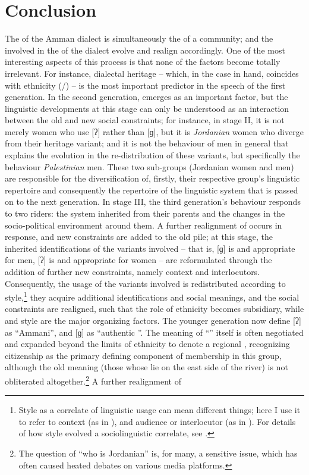 \documentclass[output=paper]{langsci/langscibook}
\begin{document}
\section{Conclusion}

The  of the Amman dialect is simultaneously the  of a community; and the  involved in the  of the dialect evolve and realign accordingly. One of the most interesting aspects of this process is that none of the factors become totally irrelevant. For instance, dialectal heritage – which, in the case in hand, coincides with ethnicity (/) – is the most important predictor in the speech of the first generation. In the second generation,  emerges as an important factor, but the linguistic developments at this stage can only be understood as an interaction between the old and new social constraints; for instance, in stage II, it is not merely women who use [ʔ] rather than [ɡ], but it is \textit{Jordanian} women who diverge from their heritage variant; and it is not the behaviour of men in general that explains the evolution in the re-distribution of these variants, but specifically the behaviour \textit{Palestinian} men. These two sub-groups (Jordanian women and  men) are responsible for the diversification of, firstly, their respective group’s linguistic repertoire and consequently the repertoire of the linguistic system that is passed on to the next generation. In stage III, the third generation’s behaviour responds to two riders: the system inherited from their parents and the changes in the socio-political environment around them. A further realignment of  occurs in response, and new constraints are added to the old pile; at this stage, the inherited identifications of the variants involved – that is, [ɡ] is  and appropriate for men, [ʔ] is  and appropriate for women – are reformulated through the addition of further new constraints, namely context and interlocutors. Consequently, the usage of the variants involved is redistributed according to style,\footnote{Style as a correlate of linguistic usage can mean different things; here I use it to refer to context (as in \citealt{Labov1972}), and audience or interlocutor (as in \citealt{Bell1984}). For details of how style evolved a sociolinguistic correlate, see \citet{EckertRickford2001}.} they acquire additional identifications and social meanings, and the social constraints are realigned, such that the role of ethnicity becomes subsidiary, while  and style are the major organizing factors. The younger generation now define [ʔ] as ``Ammani'', and [ɡ] as ``authentic ''. The meaning of ``'' itself is often negotiated and expanded beyond the limits of ethnicity to denote a regional , recognizing citizenship as the primary defining component of membership in this group, although the old meaning (those whose  lie on the east side of the river) is not obliterated altogether.\footnote{The question of “who is Jordanian” is, for many, a sensitive issue, which has often caused heated debates on various media platforms.} A further realignment of 
\end{document}

